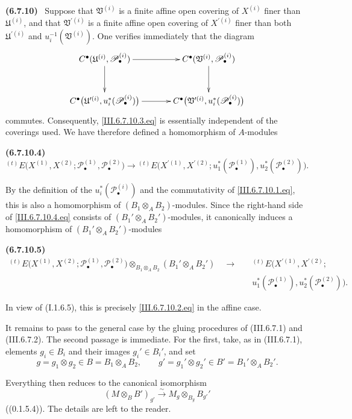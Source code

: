 \documentclass[10pt,oneside]{book}
\newcommand{\sh}[1]{\mathscr{#1}}
\newcommand{\sref}[2][]{(#2)}
\newcommand{\oldpage}[2][]{\setcounter{footnote}{0}\marginpar{\scriptsize\textbf{#1}~|~#2}\ignorespaces}
\newenvironment{env}[1][]{\par\medskip\noindent\textbf{(#1)}\ }{\par}
\begin{document}
\begin{env}[6.7.10]
Suppose that $\mathfrak V^{(i)}$ is a finite affine open covering
of $X^{(i)}$ finer than $\mathfrak U^{(i)}$, and that
$\mathfrak V^{\prime(i)}$ is a finite affine open covering of
$X^{\prime(i)}$ finer than both $\mathfrak U^{\prime(i)}$ and
$u_i^{-1}(\mathfrak V^{(i)})$.  One verifies immediately that the
diagram
\[
\xymatrix@C=34pt@R=30pt{
  C^\bullet(\mathfrak U^{(i)},\sh P_\bullet^{(i)})
  \ar[r]\ar[d]
  &
  C^\bullet(\mathfrak V^{(i)},\sh P_\bullet^{(i)})
  \ar[d]
  \\
  C^\bullet
  \bigl(
    \mathfrak U^{\prime(i)},u_i^*(\sh P_\bullet^{(i)})
  \bigr)
  \ar[r]
  &
  C^\bullet
  \bigl(
    \mathfrak V^{\prime(i)},u_i^*(\sh P_\bullet^{(i)})
  \bigr)
}
\]
commutes.  Consequently, \eqref{III.6.7.10.3.eq} is essentially
independent of the coverings used.  We have therefore defined a
homomorphism of $A$-modules
\begin{env}[6.7.10.4]
\label{III.6.7.10.4}
\[
  {}^{(t)}E
  \bigl(
    X^{(1)},X^{(2)};
    \sh P_\bullet^{(1)},\sh P_\bullet^{(2)}
  \bigr)
  \longrightarrow
  {}^{(t)}E
  \bigl(
    X^{\prime(1)},X^{\prime(2)};
    u_1^*(\sh P_\bullet^{(1)}),
    u_2^*(\sh P_\bullet^{(2)})
  \bigr).
  \tag{6.7.10.4}\label{III.6.7.10.4.eq}
\]
\end{env}
By the definition of the $u_i^*(\sh P_\bullet^{(i)})$ and the
commutativity of \eqref{III.6.7.10.1.eq}, this is also a
homomorphism of $(B_1\otimes_AB_2)$-modules.  Since the right-hand
side of \eqref{III.6.7.10.4.eq} consists of
$(B_1'\otimes_AB_2')$-modules, it canonically induces a
homomorphism of $(B_1'\otimes_AB_2')$-modules
\begin{env}[6.7.10.5]
\label{III.6.7.10.5}
\[
\begin{split}
  {}^{(t)}E
  \bigl(
    X^{(1)},X^{(2)};
    \sh P_\bullet^{(1)},\sh P_\bullet^{(2)}
  \bigr)
  \otimes_{B_1\otimes_AB_2}
  (B_1'\otimes_AB_2')
  \quad\longrightarrow\quad{}&
  {}^{(t)}E
  \bigl(
    X^{\prime(1)},X^{\prime(2)};
\\[-2pt]
    &u_1^*(\sh P_\bullet^{(1)}),
    u_2^*(\sh P_\bullet^{(2)})
  \bigr).
\end{split}
\tag{6.7.10.5}\label{III.6.7.10.5.eq}
\]
\end{env}
In view of \sref[I]{I.1.6.5}, this is precisely
\eqref{III.6.7.10.2.eq} in the affine case.

It remains to pass to the general case by the gluing procedures of
\sref{III.6.7.1} and \sref{III.6.7.2}.  The second passage is
immediate.  For the first, take, as in \sref{III.6.7.1}, elements
$g_i\in B_i$ and their images $g_i'\in B_i'$, and set
\[
  g=g_1\otimes g_2\in B=B_1\otimes_AB_2,
  \qquad
  g'=g_1'\otimes g_2'\in B'=B_1'\otimes_AB_2'.
\]

\oldpage[III]{164}

Everything then reduces to the canonical isomorphism
\[
  (M\otimes_BB')_{g'}
  \xrightarrow{\sim}
  M_g\otimes_{B_g}B_{g'}'
\]
(\sref[0]{0.1.5.4}).  The details are left to the reader.
\end{env}
\end{document}
